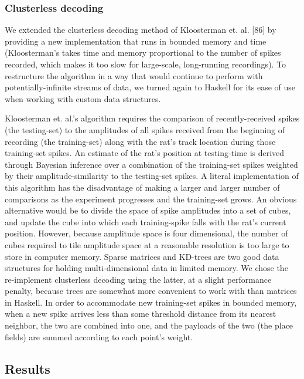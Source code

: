 \documentclass[]{article}
\begin{document}
\subsubsection{Clusterless decoding}

We extended the clusterless decoding method of Kloosterman et. al.
{[}86{]} by providing a new implementation that runs in bounded memory
and time (Kloosterman's takes time and memory proportional to the number
of spikes recorded, which makes it too slow for large-scale,
long-running recordings). To restructure the algorithm in a way that
would continue to perform with potentially-infinite streams of data, we
turned again to Haskell for its ease of use when working with custom
data structures.

Kloosterman et. al.'s algorithm requires the comparison of
recently-received spikes (the testing-set) to the amplitudes of all
spikes received from the beginning of recording (the training-set) along
with the rat's track location during those training-set spikes. An
estimate of the rat's position at testing-time is derived through
Bayesian inference over a combination of the training-set spikes
weighted by their amplitude-similarity to the testing-set spikes. A
literal implementation of this algorithm has the disadvantage of making
a larger and larger number of comparisons as the experiment progresses
and the training-set grows. An obvious alternative would be to divide
the space of spike amplitudes into a set of cubes, and update the cube
into which each training-spike falls with the rat's current position.
However, because amplitude space is four dimensional, the number of
cubes required to tile amplitude space at a reasonable resolution is too
large to store in computer memory. Sparse matrices and KD-trees are two
good data structures for holding multi-dimensional data in limited
memory. We chose the re-implement clusterless decoding using the latter,
at a slight performance penalty, because trees are somewhat more
convenient to work with than matrices in Haskell. In order to
accommodate new training-set spikes in bounded memory, when a new spike
arrives less than some threshold distance from its nearest neighbor, the
two are combined into one, and the payloads of the two (the place
fields) are summed according to each point's weight.

\subsection{Results}
\end{document}
